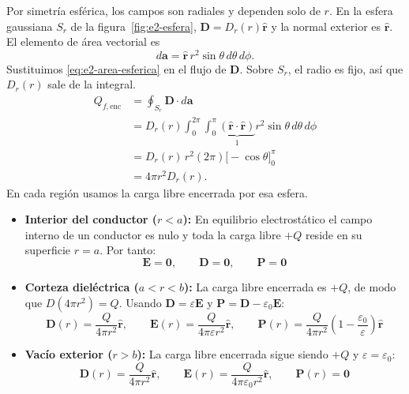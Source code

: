 \documentclass[11pt]{article}
\begin{document}
Por simetría esférica, los campos son radiales y dependen solo de $r$.
En la esfera gaussiana $S_r$ de la figura~\ref{fig:e2-esfera},
$\mathbf D=D_r(r)\hat{\mathbf r}$ y la normal exterior es
$\hat{\mathbf r}$. El elemento de área vectorial es
\begin{equation}
    d\mathbf a=\hat{\mathbf r}\,r^2\sin\theta\,d\theta\,d\phi.
    \label{eq:e2-area-esferica}
\end{equation}
Sustituimos \eqref{eq:e2-area-esferica} en el flujo de $\mathbf D$.
Sobre $S_r$, el radio es fijo, así que $D_r(r)$ sale de la integral.
\begin{align*}
    Q_{f,\mathrm{enc}}
    &=\oint_{S_r}\mathbf D\cdot d\mathbf a\\
    &=D_r(r)\int_0^{2\pi}\!\int_0^\pi
      \underbrace{(\hat{\mathbf r}\cdot\hat{\mathbf r})}_{1}
        r^2\sin\theta\,d\theta\,d\phi\\
    &=D_r(r)\,r^2(2\pi)\bigl[-\cos\theta\bigr]_0^\pi\\
    &=4\pi r^2D_r(r).
\end{align*}
En cada región usamos la carga libre encerrada por esa esfera.
\begin{itemize}
    \item \textbf{Interior del conductor ($r < a$):} En equilibrio electrostático el campo interno de un conductor es nulo y toda la carga libre $+Q$ reside en su superficie $r = a$. Por tanto:
    \begin{equation}
        \mathbf{E} = \mathbf{0}, \qquad \mathbf{D} = \mathbf{0}, \qquad \mathbf{P} = \mathbf{0}
    \end{equation}
    \item \textbf{Corteza dieléctrica ($a < r < b$):} La carga libre encerrada es $+Q$, de modo que $D(4\pi r^2) = Q$. Usando $\mathbf{D} = \varepsilon \mathbf{E}$ y $\mathbf{P} = \mathbf{D} - \varepsilon_0 \mathbf{E}$:
    \begin{equation}
        \mathbf{D}(r) = \frac{Q}{4\pi r^2} \hat{\mathbf{r}}, \qquad \mathbf{E}(r) = \frac{Q}{4\pi \varepsilon r^2} \hat{\mathbf{r}}, \qquad \mathbf{P}(r) = \frac{Q}{4\pi r^2} \left( 1 - \frac{\varepsilon_0}{\varepsilon} \right) \hat{\mathbf{r}}
    \end{equation}
    \item \textbf{Vacío exterior ($r > b$):} La carga libre encerrada sigue siendo $+Q$ y $\varepsilon = \varepsilon_0$:
    \begin{equation}
        \mathbf{D}(r) = \frac{Q}{4\pi r^2} \hat{\mathbf{r}}, \qquad \mathbf{E}(r) = \frac{Q}{4\pi \varepsilon_0 r^2} \hat{\mathbf{r}}, \qquad \mathbf{P}(r) = \mathbf{0}
    \end{equation}
\end{itemize}
\end{document}
